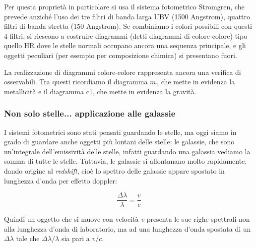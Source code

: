 Per questa proprietà in particolare si usa il sistema fotometrico Stromgren, che prevede anziché l'uso dei tre filtri di banda larga UBV (1500 Angstrom), quattro filtri di banda stretta (150 Angstrom). Se combiniamo i colori possibili con questi 4 filtri, si riescono a costruire diagrammi (detti diagrammi di colore-colore) tipo quello HR dove le stelle normali occupano ancora una sequenza principale, e gli oggetti peculiari (per esempio per composizione chimica) si presentano fuori.

La realizzazione di diagrammi colore-colore rappresenta ancora una verifica di osservabili. Tra questi ricordiamo il diagramma $m_1$ che mette in evidenza la metallicità e il diagramma c1, che mette in evidenza la gravità.

\subsubsection{Non solo stelle... applicazione alle galassie}

I sistemi fotometrici sono stati pensati guardando le stelle, ma oggi siamo in grado di guardare anche oggetti più lontani delle stelle: le galassie, che sono un'integrale dell'emissività delle stelle, infatti guardando una galassia vediamo la somma di tutte le stelle. Tuttavia, le galassie si allontanano molto rapidamente, dando origine al \textit{redshift}, cioè lo spettro delle galassie appare spostato in lunghezza d'onda per effetto doppler:

$$\frac{\Delta \lambda}{\lambda}=\frac{v}{c}$$

Quindi un oggetto che si muove con velocità $v$ presenta le sue righe spettrali non alla lunghezza d'onda di laboratorio, ma ad una lunghezza d'onda spostata di un $\Delta \lambda$ tale che $\Delta \lambda/\lambda$ sia pari a $v/c$.


